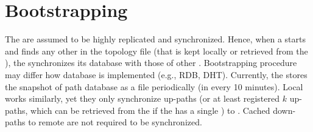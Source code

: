 \section{Bootstrapping}
The \ISDC \PS are assumed to be highly replicated and synchronized. Hence, when a \PS starts and finds any other \PSs in the topology file (that is kept locally or retrieved from the \CS), the \PS synchronizes its database with those of other \PSs. Bootstrapping procedure may differ how \PS database is implemented (e.g., RDB, DHT). Currently, the \PS stores the snapshot of path database as a file periodically (in every 10 minutes). Local \PSs works similarly, yet they only synchronize up-paths (or at least registered $k$ up-paths, which can be retrieved from the \BS if the \AD has a single \PS) to \ISDC. Cached down-paths to remote \ADs are not required to be synchronized. 



